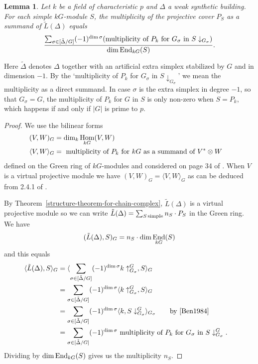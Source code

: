 \documentclass[12pt]{amsart}
\theoremstyle{plain}
\newtheorem{lemma}[theorem]{Lemma}
\theoremstyle{definition}
\theoremstyle{remark}
\numberwithin{equation}{section}
\DeclareMathOperator \End{\mathop{\rm End}\nolimits}
\DeclareMathOperator \Hom{\mathop{\rm Hom}\nolimits}
\begin{document}
\begin{lemma} Let $k$ be a  field of characteristic $p$ and $\Delta$ a weak synthetic building. For each simple
$kG$-module $S$, the multiplicity of the projective cover $P_S$
as a summand of $\tilde L(\Delta)$ equals
$$
\frac{\sum_{\sigma\in[\tilde\Delta/G]}(-1)^{\dim\sigma}
(\hbox{multiplicity of }P_k\hbox{ for }G_\sigma\hbox{ in
}S\downarrow_{G_\sigma})}
{\dim\End_{kG}(S)}.$$
\end{lemma}

Here $\tilde\Delta$ denotes $\Delta$ together with an artificial extra simplex stabilized by $G$ and in dimension $-1$. By the `multiplicity of $P_k$ for $G_\sigma$ in $S\downarrow_{G_\sigma}$' we mean the multiplicity as a direct summand. In case $\sigma$ is the extra simplex in degree $-1$, so that $G_\sigma = G$, the multiplicity of $P_k$ for $G$ in $S$ is only non-zero when $S=P_k$, which happens if and only if $|G|$ is prime to $p$.

\begin{proof}
We use the bilinear forms
$$\begin{aligned} (V,W)_G&=\dim_k\Hom_{kG}(V,W)\cr
\langle V,W\rangle_G&=\hbox{ multiplicity of $P_k$ for $kG$ as
a summand of }V^*\otimes W\cr
\end{aligned}$$
defined on the Green ring of $kG$-modules and considered on page 34 of \cite{Ben1984}.
When $V$ is a virtual projective module we have $(V,W)_G=\langle
V,W\rangle_G$ as can be deduced from 2.4.1 of
\cite{Ben1984}.

By Theorem~\ref{structure-theorem-for-chain-complex}, $\tilde L(\Delta)$ is a virtual projective module so we can write
$\tilde L(\Delta)=\sum_{S\,{\rm simple}}n_S\cdot P_S$ in the Green ring. We have
$$(\tilde L(\Delta),S)_G=n_S\cdot\dim\End_{kG}(S)$$
and this equals
$$
\begin{aligned}\langle \tilde L(\Delta), S\rangle_G
&=\langle \sum_{\sigma\in[\tilde\Delta/G]}(-1)^{\dim\sigma}
k\uparrow_{G_\sigma}^G, S\rangle_G\cr
&=\sum_{\sigma\in[\tilde\Delta/G]}(-1)^{\dim\sigma}\langle 
k\uparrow_{G_\sigma}^G, S\rangle_G\cr
&=\sum_{\sigma\in[\tilde\Delta/G]}(-1)^{\dim\sigma}\langle 
k, S\downarrow_{G_\sigma}^G\rangle_{G_\sigma}
\qquad\hbox{by \cite[Cor. 2.4.6]{Ben1984}}\cr
&=\sum_{\sigma\in[\tilde\Delta/G]}(-1)^{\dim\sigma}\hbox{
multiplicity of $P_k$ for $G_\sigma$ in }
S\downarrow_{G_\sigma}^G.\cr
\end{aligned}
$$
Dividing by $\dim\End_{kG}(S)$ gives us the multiplicity $n_S$.
\end{proof}
\end{document}
